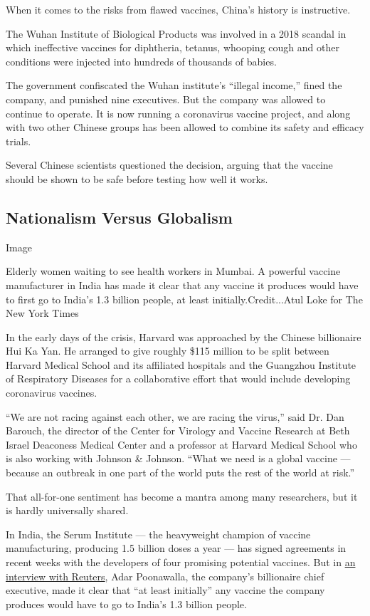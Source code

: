 When it comes to the risks from flawed vaccines, China's history is
instructive.

The Wuhan Institute of Biological Products was involved in a 2018
scandal in which ineffective vaccines for diphtheria, tetanus, whooping
cough and other conditions were injected into hundreds of thousands of
babies.

The government confiscated the Wuhan institute's ``illegal income,''
fined the company, and punished nine executives. But the company was
allowed to continue to operate. It is now running a coronavirus vaccine
project, and along with two other Chinese groups has been allowed to
combine its safety and efficacy trials.

Several Chinese scientists questioned the decision, arguing that the
vaccine should be shown to be safe before testing how well it works.

\hypertarget{nationalism-versus-globalism}{%
\subsection{Nationalism Versus
Globalism}\label{nationalism-versus-globalism}}

Image

Elderly women waiting to see health workers in Mumbai. A powerful
vaccine manufacturer in India has made it clear that any vaccine it
produces would have to first go to India's 1.3 billion people, at least
initially.Credit...Atul Loke for The New York Times

In the early days of the crisis, Harvard was approached by the Chinese
billionaire Hui Ka Yan. He arranged to give roughly \$115 million to be
split between Harvard Medical School and its affiliated hospitals and
the Guangzhou Institute of Respiratory Diseases for a collaborative
effort that would include developing coronavirus vaccines.

``We are not racing against each other, we are racing the virus,'' said
Dr. Dan Barouch, the director of the Center for Virology and Vaccine
Research at Beth Israel Deaconess Medical Center and a professor at
Harvard Medical School who is also working with Johnson \& Johnson.
``What we need is a global vaccine --- because an outbreak in one part
of the world puts the rest of the world at risk.''

That all-for-one sentiment has become a mantra among many researchers,
but it is hardly universally shared.

In India, the Serum Institute --- the heavyweight champion of vaccine
manufacturing, producing 1.5 billion doses a year --- has signed
agreements in recent weeks with the developers of four promising
potential vaccines. But in
\href{https://www.nytimes3xbfgragh.onion/reuters/2020/04/28/world/europe/28reuters-health-coronavirus-india-vaccine.html}{an
interview with Reuters}, Adar Poonawalla, the company's billionaire
chief executive, made it clear that ``at least initially'' any vaccine
the company produces would have to go to India's 1.3 billion people.

